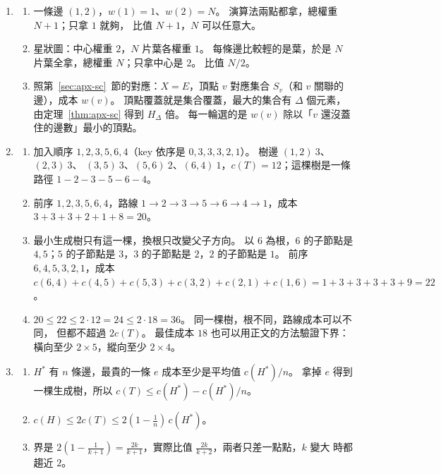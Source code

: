 \begin{enumerate}
\item
\begin{enumerate}
\item 一條邊 $(1, 2)$，$w(1) = 1$、$w(2) = N$。 演算法兩點都拿，總權重 $N + 1$；只拿 $1$ 就夠，
比值 $N + 1$，$N$ 可以任意大。
\item 星狀圖：中心權重 $2$，$N$ 片葉各權重 $1$。 每條邊比較輕的是葉，於是 $N$ 片葉全拿，總權重
$N$；只拿中心是 $2$。 比值 $N/2$。
\item 照第~\ref{sec:apx-sc}~節的對應：$X = E$，頂點 $v$ 對應集合 $S_v$（和 $v$ 關聯的邊），成本
$w(v)$。 頂點覆蓋就是集合覆蓋，最大的集合有 $\Delta$ 個元素，由定理~\ref{thm:apx-sc} 得到
$H_\Delta$ 倍。 每一輪選的是 $w(v)$ 除以「$v$ 還沒蓋住的邊數」最小的頂點。
\end{enumerate}

\item
\begin{enumerate}
\item 加入順序 $1, 2, 3, 5, 6, 4$（key 依序是 $0, 3, 3, 3, 2, 1$）。 樹邊 $(1,2)\ 3$、$(2,3)\ 3$、
$(3,5)\ 3$、$(5,6)\ 2$、$(6,4)\ 1$，$c(T) = 12$；這棵樹是一條路徑 $1 - 2 - 3 - 5 - 6 - 4$。
\item 前序 $1, 2, 3, 5, 6, 4$，路線 $1 \to 2 \to 3 \to 5 \to 6 \to 4 \to 1$，成本
$3 + 3 + 3 + 2 + 1 + 8 = 20$。
\item 最小生成樹只有這一棵，換根只改變父子方向。 以 $6$ 為根，$6$ 的子節點是 $4, 5$；$5$ 的子節點是 $3$，$3$ 的子節點是 $2$，$2$ 的子節點是 $1$。 前序
$6, 4, 5, 3, 2, 1$，成本 $c(6,4) + c(4,5) + c(5,3) + c(3,2) + c(2,1) + c(1,6) = 1 + 3 + 3 + 3 + 3 + 9
= 22$。
\item $20 \le 22 \le 2 \cdot 12 = 24 \le 2 \cdot 18 = 36$。 同一棵樹，根不同，路線成本可以不同，
但都不超過 $2c(T)$。 最佳成本 $18$ 也可以用正文的方法驗證下界：橫向至少 $2 \times 5$，縱向至少
$2 \times 4$。
\end{enumerate}

\item
\begin{enumerate}
\item $H^*$ 有 $n$ 條邊，最貴的一條 $e$ 成本至少是平均值 $c(H^*)/n$。 拿掉 $e$ 得到一棵生成樹，所以
$c(T) \le c(H^*) - c(H^*)/n$。
\item $c(H) \le 2c(T) \le 2(1 - \frac1n)\, c(H^*)$。
\item 界是 $2(1 - \frac1{k+1}) = \frac{2k}{k+1}$，實際比值 $\frac{2k}{k+2}$，兩者只差一點點，$k$ 變大
時都趨近 $2$。
\end{enumerate}


\end{enumerate}
